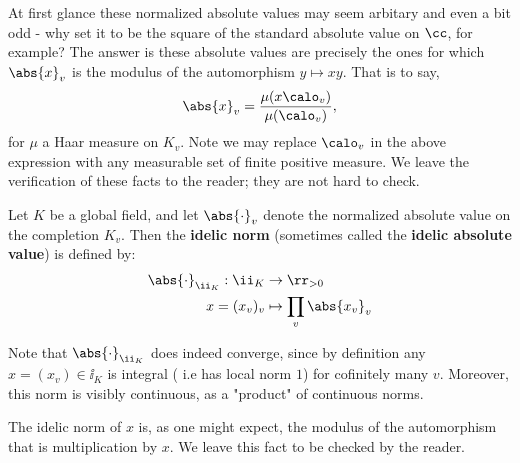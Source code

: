 \documentclass[11pt, x11names, openany]{book}
\begin{document}
At first glance these normalized absolute values may seem arbitary and even a bit odd - why set it to be the square of the standard absolute value on $\cc$, for example? The answer is these absolute values are precisely the ones for which $\abs{x}_v$ is the modulus of the automorphism $y \mapsto xy$. That is to say,
\begin{equation*}
    \abs{x}_v = \frac{\mu(x\calo_v)}{\mu(\calo_v)},
\end{equation*}
for $\mu$ a Haar measure on $K_v$. Note we may replace $\calo_v$ in the above expression with any measurable set of finite positive measure. We leave the verification of these facts to the reader; they are not hard to check.

\begin{defn}
    \label{def: idelic absolute value}
    Let $K$ be a global field, and let $\abs{\cdot}_v$ denote the normalized absolute value on the completion $K_v$. Then the \textbf{idelic norm} (sometimes called the \textbf{idelic absolute value}) is defined by:
    \begin{equation*}
        \begin{split}
            \abs{\cdot}_{\ii_K} : \ii_K &\to \rr_{> 0} \\
            x = (x_v)_v &\mapsto \prod_v \abs{x_v}_v
        \end{split}
    \end{equation*}
\end{defn}
\begin{sanitycheck}
    Note that $\abs{\cdot}_{\ii_K}$ does indeed converge, since by definition any $x = (x_v) \in \ii_K$ is integral ( i.e has local  norm $1$) for cofinitely many $v$. Moreover, this norm is visibly continuous, as a "product" of continuous norms.
\end{sanitycheck}

\begin{observation}
    The idelic norm of $x$ is, as one might expect, the modulus of the automorphism that is multiplication by $x$. We leave this fact to be checked by the reader.
\end{observation}
\end{document}
